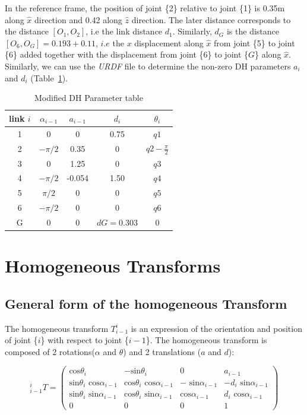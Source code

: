 \documentclass[a4paper,12pt]{report}
\begin{document}
In the reference frame, the position of joint \{2\} relative to joint \{1\}  is 0.35m along $\hat{x}$ direction and 0.42 along $\hat{z}$ direction. The later distance corresponds to the distance $[O_1, O_2]$, i.e the link distance $d_1$. Similarly, $d_G$ is the distance $[O_6, O_G] = 0.193 + 0.11$, $i.e$ the $x$ displacement along $\hat{x}$ from joint \{5\} to joint \{6\} added together with the displacement from joint \{6\} to joint \{$G$\} along $\hat{x}$. Similarly, we can use the \textit{URDF} file to determine the non-zero DH parameters $a_i$ and $d_i$ (Table~\ref{table:dh_table}).


\begin{table}[H]
\centering
\begin{tabular}{ | c | c | c | c| c | }
\hline
 link $i$ & $\alpha_{i-1}$ & $a_{i-1}$  & $d_i$ & $\theta_i$ \\ 
 \hline
1 & 0 & 0 & 0.75 & $q1$ \\  
 \hline
2 & $-\pi/2$ & 0.35 & 0 & $q2 - \frac{\pi}{2}$ \\
 \hline
3 & 0 & 1.25 & 0 & $q3$ \\ 
 \hline
4 & $-\pi/2$ & -0.054 & 1.50 & $q4$ \\ 
 \hline
5 & $\pi/2$ & 0 & 0 & $q5$ \\ 
 \hline
6 & $-\pi/2$ & 0 & 0 & $q6$ \\ 
 \hline
G & 0 & 0 & $dG = 0.303$ & 0 \\ 
   \hline 
\end{tabular}
\caption{Modified DH Parameter table}
\label{table:dh_table}
\end{table}

\section{Homogeneous Transforms}
\subsection{General form of the homogeneous Transform}
The homogeneous transform $T_{i-1} ^{i}$ is an expression of the orientation and position of joint \{$i$\} with respect to joint \{$i-1$\}. The homogeneous transform is composed of 2 rotations($\alpha$ and $\theta$) and 2 translations ($a$ and $d$):

\begin{equation}
\label{eqTransf}
_{i-1} ^{i} T  = \left( \begin{matrix} \text{cos} \theta_i & -\text{sin} \theta_i & 0 & a_{i-1} \\
\text{sin} \theta_i \text{\ cos} \alpha_{i-1} & \text{cos} \theta_i \text{\ cos} \alpha_{i-1}& -\text{\ sin} \alpha_{i-1} & -d_i \text{\ sin} \alpha_{i-1} \\
\text{sin} \theta_i \text{\ sin} \alpha_{i-1} & \text{cos} \theta_i \text{\ sin} \alpha_{i-1} & \text{cos} \alpha_{i-1} & d_i \text{\ cos} \alpha_{i-1} \\
0 & 0 & 0 & 1
\end{matrix} \right)
\end{equation}
\end{document}
